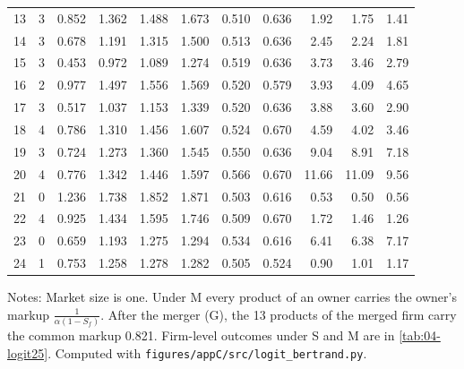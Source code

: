 \begin{table}[htbp]
\begin{tabular}{@{}rrrrrrrrrrr@{}}
13 & 3 & 0.852 & 1.362 & 1.488 & 1.673 & 0.510 & 0.636 & 1.92 & 1.75 & 1.41 \\
14 & 3 & 0.678 & 1.191 & 1.315 & 1.500 & 0.513 & 0.636 & 2.45 & 2.24 & 1.81 \\
15 & 3 & 0.453 & 0.972 & 1.089 & 1.274 & 0.519 & 0.636 & 3.73 & 3.46 & 2.79 \\
16 & 2 & 0.977 & 1.497 & 1.556 & 1.569 & 0.520 & 0.579 & 3.93 & 4.09 & 4.65 \\
17 & 3 & 0.517 & 1.037 & 1.153 & 1.339 & 0.520 & 0.636 & 3.88 & 3.60 & 2.90 \\
18 & 4 & 0.786 & 1.310 & 1.456 & 1.607 & 0.524 & 0.670 & 4.59 & 4.02 & 3.46 \\
19 & 3 & 0.724 & 1.273 & 1.360 & 1.545 & 0.550 & 0.636 & 9.04 & 8.91 & 7.18 \\
20 & 4 & 0.776 & 1.342 & 1.446 & 1.597 & 0.566 & 0.670 & 11.66 & 11.09 & 9.56 \\
21 & 0 & 1.236 & 1.738 & 1.852 & 1.871 & 0.503 & 0.616 & 0.53 & 0.50 & 0.56 \\
22 & 4 & 0.925 & 1.434 & 1.595 & 1.746 & 0.509 & 0.670 & 1.72 & 1.46 & 1.26 \\
23 & 0 & 0.659 & 1.193 & 1.275 & 1.294 & 0.534 & 0.616 & 6.41 & 6.38 & 7.17 \\
24 & 1 & 0.753 & 1.258 & 1.278 & 1.282 & 0.505 & 0.524 & 0.90 & 1.01 & 1.17 \\
\bottomrule
\end{tabular}

\vspace{3pt}
\begin{minipage}{0.97\textwidth}
\footnotesize Notes: Market size is one. Under M every product of an owner carries the owner's markup
$\frac{1}{\alpha(1 - S_f)}$. After the merger (G), the 13 products of the merged firm carry the common markup 0.821.
Firm-level outcomes under S and M are in \cref{tab:04-logit25}. Computed with
\texttt{figures/appC/src/logit\_bertrand.py}.
\end{minipage}
\end{table}

